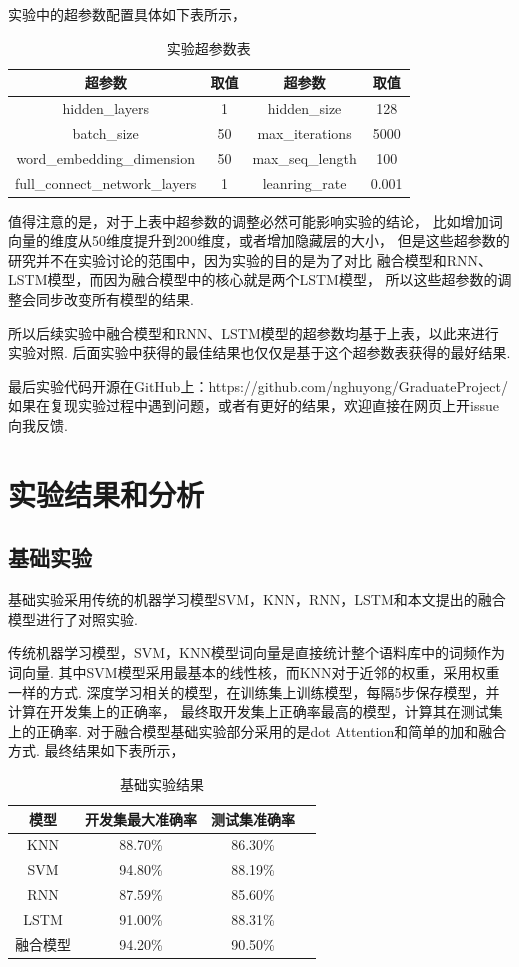 \documentclass[bachelor,adobefonts]{jnuthesis}
\begin{document}
实验中的超参数配置具体如下表所示，

\begin{table}[h!]
  \centering
  \begin{tabular}{cccc}
    \toprule
    \textbf{超参数} & \textbf{取值} & \textbf{超参数} & \textbf{取值}  \\
    \midrule
    hidden\_layers & 1 & hidden\_size & 128 \\
    batch\_size &  50 & max\_iterations & 5000 \\
    word\_embedding\_dimension & 50 & max\_seq\_length & 100 \\
    full\_connect\_network\_layers & 1 & leanring\_rate & 0.001 \\
    \bottomrule
  \end{tabular}
  \caption{实验超参数表}
\end{table}

值得注意的是，对于上表中超参数的调整必然可能影响实验的结论，
比如增加词向量的维度从50维度提升到200维度，或者增加隐藏层的大小，
但是这些超参数的研究并不在实验讨论的范围中，因为实验的目的是为了对比
融合模型和RNN、LSTM模型，而因为融合模型中的核心就是两个LSTM模型，
所以这些超参数的调整会同步改变所有模型的结果.

所以后续实验中融合模型和RNN、LSTM模型的超参数均基于上表，以此来进行实验对照.
后面实验中获得的最佳结果也仅仅是基于这个超参数表获得的最好结果.

最后实验代码开源在GitHub上：https://github.com/nghuyong/GraduateProject/
如果在复现实验过程中遇到问题，或者有更好的结果，欢迎直接在网页上开issue向我反馈.

\section{实验结果和分析}
\subsection{基础实验}
基础实验采用传统的机器学习模型SVM，KNN，RNN，LSTM和本文提出的融合模型进行了对照实验.

传统机器学习模型，SVM，KNN模型词向量是直接统计整个语料库中的词频作为词向量.
其中SVM模型采用最基本的线性核，而KNN对于近邻的权重，采用权重一样的方式.
深度学习相关的模型，在训练集上训练模型，每隔5步保存模型，并计算在开发集上的正确率，
最终取开发集上正确率最高的模型，计算其在测试集上的正确率.
对于融合模型基础实验部分采用的是dot Attention和简单的加和融合方式.
最终结果如下表所示，

\begin{table}[h!]
  \centering
  \begin{tabular}{cccc}
    \toprule
    \textbf{模型} & \textbf{开发集最大准确率} & \textbf{测试集准确率} \\
    \midrule
    KNN & 88.70\% & 86.30\% \\
    SVM & 94.80\% & 88.19\% \\
    RNN & 87.59\% & 85.60\% \\
    LSTM & 91.00\% & 88.31\% \\
    融合模型 & 94.20\% & 90.50\% \\
    \bottomrule
  \end{tabular}
  \caption{基础实验结果}
\end{table}
\end{document}
